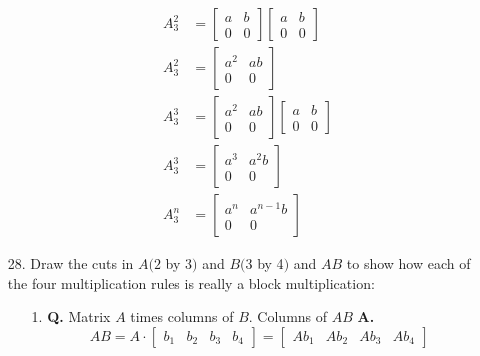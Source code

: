 \documentclass[main.tex]{subfiles}
\begin{document}
\begin{enumerate}
    $$
    \begin{aligned}
    A_{3}^{2} &=\left[\begin{array}{ll}
    a & b \\
    0 & 0
    \end{array}\right]\left[\begin{array}{ll}
    a & b \\
    0 & 0
    \end{array}\right] \\
    A_{3}^{2} &=\left[\begin{array}{cc}
    a^{2} & a b \\
    0 & 0
    \end{array}\right]\\
    A_{3}^{3} &= \left[\begin{array}{cc}
    a^{2} & a b \\
    0 & 0
    \end{array}\right]\left[\begin{array}{ll}
    a & b \\
    0 & 0
    \end{array}\right] \\
    A_{3}^{3} &= \left[\begin{array}{cc}
    a^{3} & a^{2} b \\
    0 & 0
    \end{array}\right]\\
    A_{3}^{n} &= \left[\begin{array}{cc}
    a^{n} & a^{n-1} b \\
    0 & 0
    \end{array}\right]
    \end{aligned}
    $$
    
    \item [28.] Draw the cuts in $A(2$ by 3$)$ and $B(3$ by 4$)$ and $A B$ to show how each of the four multiplication rules is really a block multiplication:
    \begin{enumerate}
        \item [1.] \textbf{Q.} Matrix $A$ times columns of $B$. Columns of $A B$ \textbf{A.}
        $$
        A B=A \cdot\left[\begin{array}{llll}
        b_{1} & b_{2} & b_{3} & b_{4}
        \end{array}\right]=\left[\begin{array}{llll}
        A b_{1} & A b_{2} & A b_{3} & A b_{4}
        \end{array}\right]
        $$
        

\end{enumerate}
\end{enumerate}
\end{document}
